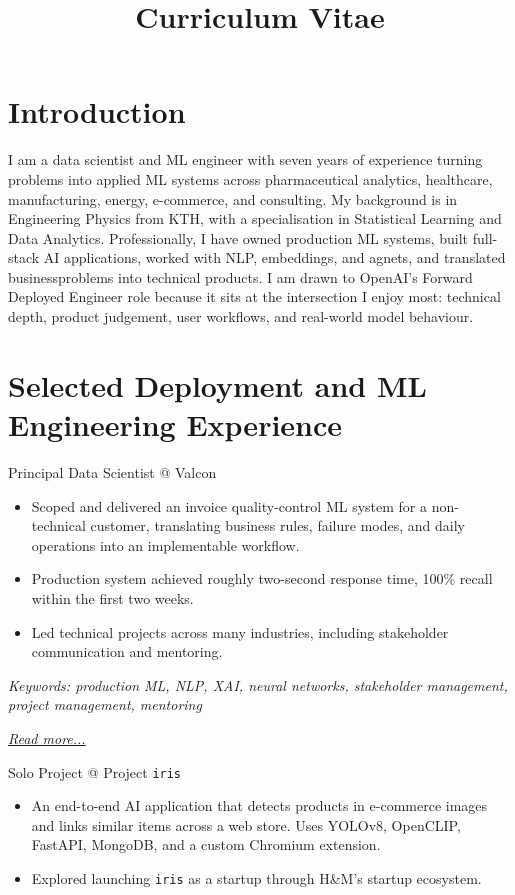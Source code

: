 \documentclass[11pt,a4paper]{moderncv}
\title{Curriculum Vitae}
\begin{document}
\makecvtitle

\section*{Introduction}
I am a data scientist and ML engineer with seven years of experience turning problems into applied ML systems across pharmaceutical analytics, healthcare, manufacturing, energy, e-commerce, and consulting. My background is in Engineering Physics from KTH, with a specialisation in Statistical Learning and Data Analytics.
\newline\hspace*{2em}
Professionally, I have owned production ML systems, built full-stack AI applications, worked with NLP, embeddings, and agnets, and translated businessproblems into technical products.
\newline\hspace*{2em}
I am drawn to OpenAI's Forward Deployed Engineer role because it sits at the intersection I enjoy most: technical depth, product judgement, user workflows, and real-world model behaviour.

\section{Selected Deployment and ML Engineering Experience}

\large{Principal Data Scientist @ Valcon}
\normalsize
\begin{itemize}
    \item Scoped and delivered an invoice quality-control ML system for a non-technical customer, translating business rules, failure modes, and daily operations into an implementable workflow.
    \item Production system achieved roughly two-second response time, 100\% recall within the first two weeks.
    \item Led technical projects across many industries, including stakeholder communication and mentoring.
\end{itemize}

{\footnotesize\textit{Keywords: production ML, NLP, XAI, neural networks, stakeholder management, project management, mentoring}}

\hfill{\small{\textit{\hyperref[sec:valcon]{Read more...}}}}

\large{Solo Project @ Project \texttt{iris}}
\normalsize
\begin{itemize}
    \item An end-to-end AI application that detects products in e-commerce images and links similar items across a web store. Uses YOLOv8, OpenCLIP, FastAPI, MongoDB, and a custom Chromium extension.
    \item Explored launching \texttt{iris} as a startup through H\&M's startup ecosystem.
\end{itemize}
\end{document}
